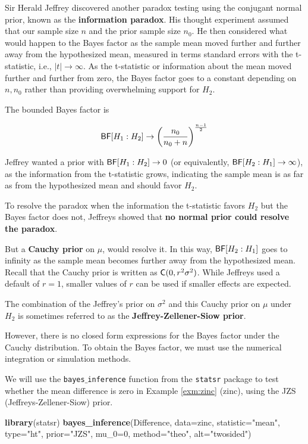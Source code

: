 \documentclass[]{book}
\newenvironment{Shaded}{\begin{snugshade}}{\end{snugshade}}
\newcommand{\KeywordTok}[1]{\textcolor[rgb]{0.13,0.29,0.53}{\textbf{#1}}}
\newcommand{\DataTypeTok}[1]{\textcolor[rgb]{0.13,0.29,0.53}{#1}}
\newcommand{\DecValTok}[1]{\textcolor[rgb]{0.00,0.00,0.81}{#1}}
\newcommand{\StringTok}[1]{\textcolor[rgb]{0.31,0.60,0.02}{#1}}
\newcommand{\NormalTok}[1]{#1}
\theoremstyle{definition}
\theoremstyle{definition}
\theoremstyle{definition}
\theoremstyle{remark}
\begin{document}
Sir Herald Jeffrey discovered another paradox testing using the
conjugant normal prior, known as the \textbf{information paradox}. His
thought experiment assumed that our sample size \(n\) and the prior
sample size \(n_0\). He then considered what would happen to the Bayes
factor as the sample mean moved further and further away from the
hypothesized mean, measured in terms standard errors with the
t-statistic, i.e., \(|t| \to \infty\). As the t-statistic or information
about the mean moved further and further from zero, the Bayes factor
goes to a constant depending on \(n, n_0\) rather than providing
overwhelming support for \(H_2\).

The bounded Bayes factor is

\[\textsf{BF}[H_1 : H_2] \to \left( \frac{n_0}{n_0 + n}  \right)^{\frac{n - 1}{2}}\]

Jeffrey wanted a prior with \(\textsf{BF}[H_1 : H_2] \to 0\) (or equivalently,
\(\textsf{BF}[H_2 : H_1] \to \infty\)), as the information from the t-statistic
grows, indicating the sample mean is as far as from the hypothesized
mean and should favor \(H_2\).

To resolve the paradox when the information the t-statistic favors
\(H_2\) but the Bayes factor does not, Jeffreys showed that \textbf{no
normal prior could resolve the paradox}.

But a \textbf{Cauchy prior} on \(\mu\), would resolve it. In this way,
\(\textsf{BF}[H_2 : H_1]\) goes to infinity as the sample mean becomes further
away from the hypothesized mean. Recall that the Cauchy prior is written
as \(\textsf{C}(0, r^2 \sigma^2)\). While Jeffreys used a default of \(r = 1\),
smaller values of \(r\) can be used if smaller effects are expected.

The combination of the Jeffrey's prior on \(\sigma^2\) and this Cauchy
prior on \(\mu\) under \(H_2\) is sometimes referred to as the
\textbf{Jeffrey-Zellener-Siow prior}.

However, there is no closed form expressions for the Bayes factor under
the Cauchy distribution. To obtain the Bayes factor, we must use the
numerical integration or simulation methods.

We will use the \texttt{bayes$\_$inference} function from the
\texttt{statsr} package to test whether the mean difference is zero in
Example \ref{exm:zinc} (zinc), using the JZS (Jeffreys-Zellener-Siow)
prior.

\begin{Shaded}
\begin{Highlighting}[]
\KeywordTok{library}\NormalTok{(statsr)}
\KeywordTok{bayes_inference}\NormalTok{(Difference, }\DataTypeTok{data=}\NormalTok{zinc, }\DataTypeTok{statistic=}\StringTok{"mean"}\NormalTok{, }\DataTypeTok{type=}\StringTok{"ht"}\NormalTok{,}
                \DataTypeTok{prior=}\StringTok{"JZS"}\NormalTok{, }\DataTypeTok{mu_0=}\DecValTok{0}\NormalTok{, }\DataTypeTok{method=}\StringTok{"theo"}\NormalTok{, }\DataTypeTok{alt=}\StringTok{"twosided"}\NormalTok{)}
\end{Highlighting}
\end{Shaded}
\end{document}
